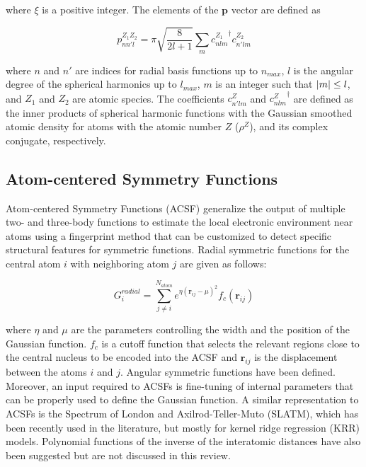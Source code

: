 \noindent where $\xi$ is a positive integer. The elements of the $\mathbf{p}$ vector are defined as 

\begin{equation}
    p^{Z_1 Z_2}_{n n' l} = \pi \sqrt{\frac{8}{2l+1}}\sum_m {c^{Z_1}_{n l m}}^{\dagger} c^{Z_2}_{n' l m}
\end{equation}

\noindent where $n$ and $n'$ are indices for radial basis functions up to $n_{max}$, $l$ is 
the angular degree of the spherical harmonics up to $l_{max}$, $m$ is an integer such that 
$\abs{m} \leq l$, and $Z_{1}$ and $Z_{2}$ are atomic species. The coefficients $c^{Z}_{n'lm}$ and 
${c^{Z}_{nlm}}^{\dagger}$ are defined as the inner products of spherical harmonic functions with 
the Gaussian smoothed atomic density for atoms with the atomic number $Z$ ($\rho^Z$), and its complex conjugate, 
respectively.\cite{de2016}

\subsection{Atom-centered Symmetry Functions}

Atom-centered Symmetry Functions (ACSF) generalize the output of multiple two- and three-body functions 
to estimate the local electronic environment near atoms using a fingerprint method that can be customized 
to detect specific structural features for symmetric functions.\cite{behler2011} Radial symmetric functions 
for the central atom $i$ with neighboring atom $j$ are given as follows:

\begin{equation}
    G^{radial}_{i} = \sum^{N_{atom}}_{j \neq i} e^{\eta (\boldsymbol{r}_{ij} - \mu)^{2}} f_{c}(\boldsymbol{r}_{ij})
\end{equation}

\noindent where $\eta$ and $\mu$ are the parameters controlling the width and the position of 
the Gaussian function. $f_{c}$ is a cutoff function that selects the relevant regions close to 
the central nucleus to be encoded into the ACSF and $\boldsymbol{r}_{ij}$ is the displacement between 
the atoms $i$ and $j$. Angular symmetric functions have been defined.\cite{behler2011} 
Moreover, an input required to ACSFs is fine-tuning of internal parameters that can be properly used 
to define the Gaussian function. A similar representation to ACSFs is the Spectrum of London and 
Axilrod-Teller-Muto (SLATM), which has been recently used in the literature, but mostly for 
kernel ridge regression (KRR) models.\cite{faber2018} Polynomial functions of the inverse of 
the interatomic distances have also been suggested but are not discussed in this review.\cite{musil2021}

